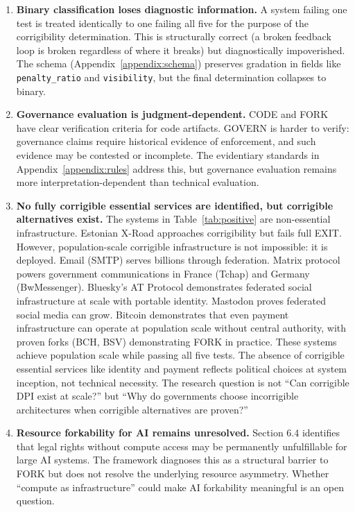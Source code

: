 \begin{enumerate}
    \item \textbf{Binary classification loses diagnostic information.} A system failing one test is treated identically to one failing all five for the purpose of the corrigibility determination. This is structurally correct (a broken feedback loop is broken regardless of where it breaks) but diagnostically impoverished. The schema (Appendix~\ref{appendix:schema}) preserves gradation in fields like \texttt{penalty\_ratio} and \texttt{visibility}, but the final determination collapses to binary.

    \item \textbf{Governance evaluation is judgment-dependent.} CODE and FORK have clear verification criteria for code artifacts. GOVERN is harder to verify: governance claims require historical evidence of enforcement, and such evidence may be contested or incomplete. The evidentiary standards in Appendix~\ref{appendix:rules} address this, but governance evaluation remains more interpretation-dependent than technical evaluation.

    \item \textbf{No fully corrigible essential services are identified, but corrigible alternatives exist.} The systems in Table~\ref{tab:positive} are non-essential infrastructure. Estonian X-Road approaches corrigibility but fails full EXIT. However, population-scale corrigible infrastructure is not impossible: it is deployed. Email (SMTP) serves billions through federation. Matrix protocol powers government communications in France (Tchap) and Germany (BwMessenger). Bluesky's AT Protocol demonstrates federated social infrastructure at scale with portable identity. Mastodon proves federated social media can grow. Bitcoin demonstrates that even payment infrastructure can operate at population scale without central authority, with proven forks (BCH, BSV) demonstrating FORK in practice. These systems achieve population scale while passing all five tests. The absence of corrigible essential services like identity and payment reflects political choices at system inception, not technical necessity. The research question is not ``Can corrigible DPI exist at scale?'' but ``Why do governments choose incorrigible architectures when corrigible alternatives are proven?''

    \item \textbf{Resource forkability for AI remains unresolved.} Section 6.4 identifies that legal rights without compute access may be permanently unfulfillable for large AI systems. The framework diagnoses this as a structural barrier to FORK but does not resolve the underlying resource asymmetry. Whether ``compute as infrastructure'' could make AI forkability meaningful is an open question.


\end{enumerate}
